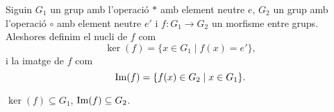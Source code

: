 \documentclass[../Apunts.tex]{subfiles}
\begin{document}
	\begin{definition}
		\label{def:nucli d'un morfisme entre grups}
		\label{def:imatge d'un morfisme entre grups}
			Siguin \(G_{1}\) un grup amb l'operació \(\ast\) amb element neutre \(e\), \(G_{2}\) un grup amb l'operació \(\circ\) amb  element neutre \(e'\) i \(f\colon G_{1}\to G_{2}\) un morfisme entre grups. Aleshores definim el nucli de \(f\) com
		\[\ker(f)=\{x\in G_{1}\mid f(x)=e'\},\]
		i la imatge de \(f\) com
		\[\operatorname*{Im}(f)=\{f(x)\in G_{2}\mid x\in G_{1}\}.\]
	\end{definition}
	\begin{observation}
		\label{obs:nucli d'un morfisme entre grups es subconjunt del grup d'entrada, imatge n'és del de sortida}
		\(\ker(f)\subseteq G_{1}\), \(\operatorname*{Im}(f)\subseteq G_{2}\).
	\end{observation}
\end{document}
